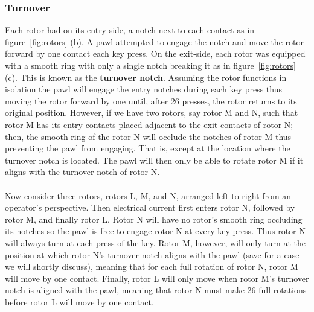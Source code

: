 \subsubsection{Turnover}
Each rotor had on its entry-side, a notch next to each contact as in
figure~\ref{fig:rotors} (b). A pawl
attempted to engage
the notch and move the rotor forward by one contact each key press.
On the exit-side, each
rotor was equipped with a smooth ring with only a single notch
breaking it as in figure~\ref{fig:rotors} (c). This is known as the
{\bf{turnover notch}}. Assuming the
rotor functions in isolation the pawl will engage the entry notches
during each key press thus moving the rotor forward by one until,
after 26 presses, the rotor returns to its original position.
However, if we have two rotors, say rotor M and N, such that rotor M
has its entry contacts placed adjacent to the exit contacts of rotor
N; then, the smooth ring of the rotor N will occlude the notches of
rotor M thus preventing the pawl from engaging. That is, except at
the location where the turnover notch is located. The pawl will then
only be able to rotate rotor M if it aligns with the turnover notch of rotor N.
\\\\Now consider three rotors, rotors L, M, and N, arranged left to
right from an operator's perspective. Then electrical current first
enters rotor N, followed by rotor M, and finally rotor L. Rotor N
will have no rotor's smooth ring occluding its notches so the pawl is
free to engage rotor N at every key press. Thus rotor N will always
turn at each press of the key. Rotor M, however, will only turn at
the position at which rotor N's turnover notch aligns with the pawl
(save for a case we will shortly discuss),
meaning that for each full rotation of rotor N, rotor M will move
by one contact. Finally, rotor L will only move when rotor M's
turnover notch is aligned with the pawl, meaning that rotor N must
make 26 full rotations before rotor L will move by one contact.

